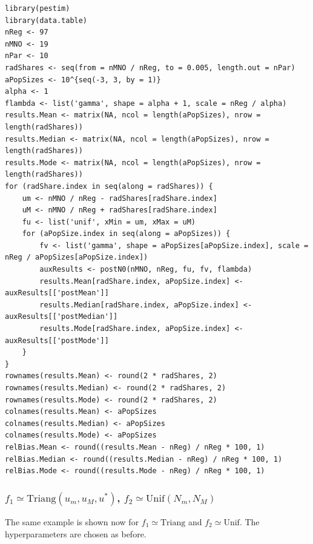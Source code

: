 \documentclass[12pt, a4paper]{article}
\begin{document}
\begin{verbatim}
library(pestim)
library(data.table)
nReg <- 97
nMNO <- 19
nPar <- 10
radShares <- seq(from = nMNO / nReg, to = 0.005, length.out = nPar)
aPopSizes <- 10^{seq(-3, 3, by = 1)}
alpha <- 1
flambda <- list('gamma', shape = alpha + 1, scale = nReg / alpha)
results.Mean <- matrix(NA, ncol = length(aPopSizes), nrow = length(radShares))
results.Median <- matrix(NA, ncol = length(aPopSizes), nrow = length(radShares))
results.Mode <- matrix(NA, ncol = length(aPopSizes), nrow = length(radShares))
for (radShare.index in seq(along = radShares)) {
    um <- nMNO / nReg - radShares[radShare.index]
    uM <- nMNO / nReg + radShares[radShare.index]
    fu <- list('unif', xMin = um, xMax = uM)
    for (aPopSize.index in seq(along = aPopSizes)) {
        fv <- list('gamma', shape = aPopSizes[aPopSize.index], scale = nReg / aPopSizes[aPopSize.index])
        auxResults <- postN0(nMNO, nReg, fu, fv, flambda)
        results.Mean[radShare.index, aPopSize.index] <- auxResults[['postMean']] 
        results.Median[radShare.index, aPopSize.index] <- auxResults[['postMedian']]
        results.Mode[radShare.index, aPopSize.index] <- auxResults[['postMode']]
    }
}
rownames(results.Mean) <- round(2 * radShares, 2)
rownames(results.Median) <- round(2 * radShares, 2)
rownames(results.Mode) <- round(2 * radShares, 2)
colnames(results.Mean) <- aPopSizes
colnames(results.Median) <- aPopSizes
colnames(results.Mode) <- aPopSizes
relBias.Mean <- round((results.Mean - nReg) / nReg * 100, 1)
relBias.Median <- round((results.Median - nReg) / nReg * 100, 1)
relBias.Mode <- round((results.Mode - nReg) / nReg * 100, 1)
\end{verbatim}

\subsubsection{$f_{1}\simeq\textrm{Triang}(u_{m}, u_{M}, u^{*})$, $f_{2}\simeq\textrm{Unif}(N_{m}, N_{M})$}

The same example is shown now for $f_{1}\simeq\textrm{Triang}$ and $f_{2}\simeq\textrm{Unif}$. The hyperparameters are chosen as before.
\end{document}
